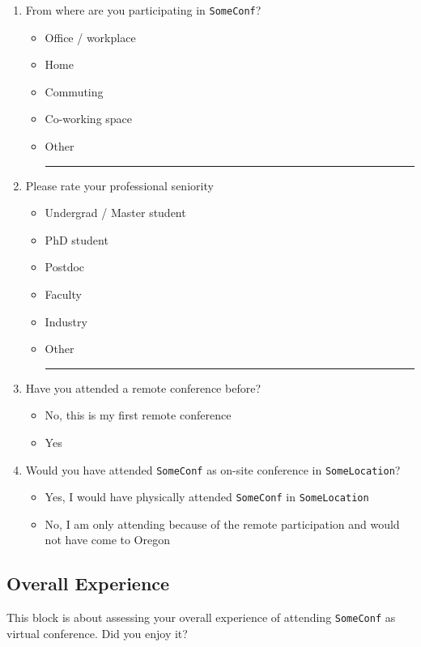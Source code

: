 \documentclass[sigconf]{acmart}
\newcommand{\confname}[0]{\texttt{SomeConf}\xspace}
\newcommand{\confloc}[0]{\texttt{SomeLocation}\xspace}
\newcommand{\QO}{$\Box$}%
\newenvironment{Qlist}{%
\renewcommand{\labelitemi}{\QO}
\begin{itemize}[leftmargin=1.5em,topsep=-.5em]
}{%
\end{itemize}
}
\newcommand{\Qline}[1]{\noindent\rule{#1}{0.6pt}}
\begin{document}
\begin{appendix}
\begin{enumerate}
	\item From where are you participating in \confname?
		\begin{Qlist}
			\item Office / workplace
			\item Home
			\item Commuting
			\item Co-working space
			\item Other \Qline{3cm}
		\end{Qlist}

	\item Please rate your professional seniority
		\begin{Qlist}
			\item Undergrad / Master student
			\item PhD student
			\item Postdoc
			\item Faculty
			\item Industry
			\item Other \Qline{3cm}
		\end{Qlist}

	\item Have you attended a remote conference before?
		\begin{Qlist}
			\item No, this is my first remote conference
			\item Yes
		\end{Qlist}

	\item Would you have attended \confname as on-site conference in \confloc?
		\begin{Qlist}
			\item Yes, I would have physically attended \confname in \confloc
			\item No, I am only attending because of the remote participation and would not have come to Oregon
		\end{Qlist}

\setcounter{postConfCounter}{\value{enumi}}
\end{enumerate}


\subsection{Overall Experience}
This block is about assessing your overall experience of attending \confname as virtual conference. Did you enjoy it?

\begin{enumerate}
\setcounter{enumi}{\value{postConfCounter}}


\end{enumerate}
\end{appendix}
\end{document}
